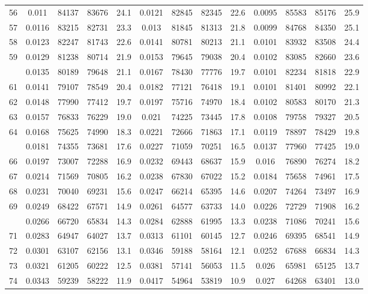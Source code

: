 \documentclass[
  14pt,
]{article}
\begin{document}
\begin{longtable}[t]{lcccccccccccc}
56 & 0.011 & 84137 & 83676 & 24.1 & 0.0121 & 82845 & 82345 & 22.6 & 0.0095 & 85583 & 85176 & 25.9\\
57 & 0.0116 & 83215 & 82731 & 23.3 & 0.013 & 81845 & 81313 & 21.8 & 0.0099 & 84768 & 84350 & 25.1\\
58 & 0.0123 & 82247 & 81743 & 22.6 & 0.0141 & 80781 & 80213 & 21.1 & 0.0101 & 83932 & 83508 & 24.4\\
59 & 0.0129 & 81238 & 80714 & 21.9 & 0.0153 & 79645 & 79038 & 20.4 & 0.0102 & 83085 & 82660 & 23.6\\
\addlinespace
60 & 0.0135 & 80189 & 79648 & 21.1 & 0.0167 & 78430 & 77776 & 19.7 & 0.0101 & 82234 & 81818 & 22.9\\
61 & 0.0141 & 79107 & 78549 & 20.4 & 0.0182 & 77121 & 76418 & 19.1 & 0.0101 & 81401 & 80992 & 22.1\\
62 & 0.0148 & 77990 & 77412 & 19.7 & 0.0197 & 75716 & 74970 & 18.4 & 0.0102 & 80583 & 80170 & 21.3\\
63 & 0.0157 & 76833 & 76229 & 19.0 & 0.021 & 74225 & 73445 & 17.8 & 0.0108 & 79758 & 79327 & 20.5\\
64 & 0.0168 & 75625 & 74990 & 18.3 & 0.0221 & 72666 & 71863 & 17.1 & 0.0119 & 78897 & 78429 & 19.8\\
\addlinespace
65 & 0.0181 & 74355 & 73681 & 17.6 & 0.0227 & 71059 & 70251 & 16.5 & 0.0137 & 77960 & 77425 & 19.0\\
66 & 0.0197 & 73007 & 72288 & 16.9 & 0.0232 & 69443 & 68637 & 15.9 & 0.016 & 76890 & 76274 & 18.2\\
67 & 0.0214 & 71569 & 70805 & 16.2 & 0.0238 & 67830 & 67022 & 15.2 & 0.0184 & 75658 & 74961 & 17.5\\
68 & 0.0231 & 70040 & 69231 & 15.6 & 0.0247 & 66214 & 65395 & 14.6 & 0.0207 & 74264 & 73497 & 16.9\\
69 & 0.0249 & 68422 & 67571 & 14.9 & 0.0261 & 64577 & 63733 & 14.0 & 0.0226 & 72729 & 71908 & 16.2\\
\addlinespace
70 & 0.0266 & 66720 & 65834 & 14.3 & 0.0284 & 62888 & 61995 & 13.3 & 0.0238 & 71086 & 70241 & 15.6\\
71 & 0.0283 & 64947 & 64027 & 13.7 & 0.0313 & 61101 & 60145 & 12.7 & 0.0246 & 69395 & 68541 & 14.9\\
72 & 0.0301 & 63107 & 62156 & 13.1 & 0.0346 & 59188 & 58164 & 12.1 & 0.0252 & 67688 & 66834 & 14.3\\
73 & 0.0321 & 61205 & 60222 & 12.5 & 0.0381 & 57141 & 56053 & 11.5 & 0.026 & 65981 & 65125 & 13.7\\
74 & 0.0343 & 59239 & 58222 & 11.9 & 0.0417 & 54964 & 53819 & 10.9 & 0.027 & 64268 & 63401 & 13.0\\

\end{longtable}
\end{document}
